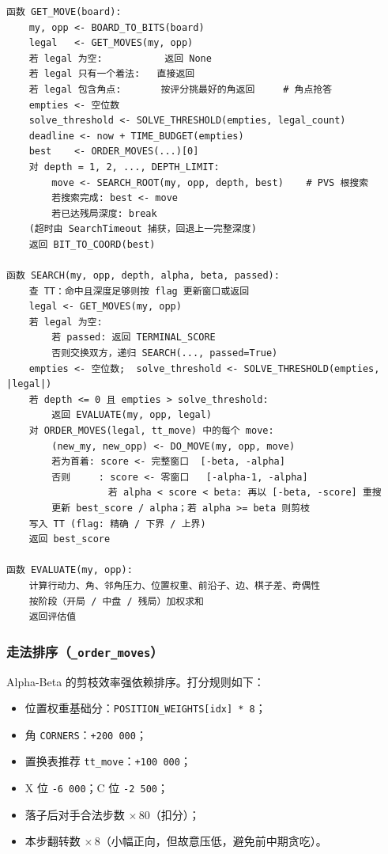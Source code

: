 \documentclass[UTF8,a4paper,11pt]{ctexart}
\begin{document}
\begin{lstlisting}[style=pseudostyle,caption={最终版伪代码（对应 \texttt{main.py}）}]
函数 GET_MOVE(board):
    my, opp <- BOARD_TO_BITS(board)
    legal   <- GET_MOVES(my, opp)
    若 legal 为空:           返回 None
    若 legal 只有一个着法:   直接返回
    若 legal 包含角点:       按评分挑最好的角返回     # 角点抢答
    empties <- 空位数
    solve_threshold <- SOLVE_THRESHOLD(empties, legal_count)
    deadline <- now + TIME_BUDGET(empties)
    best    <- ORDER_MOVES(...)[0]
    对 depth = 1, 2, ..., DEPTH_LIMIT:
        move <- SEARCH_ROOT(my, opp, depth, best)    # PVS 根搜索
        若搜索完成: best <- move
        若已达残局深度: break
    (超时由 SearchTimeout 捕获，回退上一完整深度)
    返回 BIT_TO_COORD(best)

函数 SEARCH(my, opp, depth, alpha, beta, passed):
    查 TT：命中且深度足够则按 flag 更新窗口或返回
    legal <- GET_MOVES(my, opp)
    若 legal 为空:
        若 passed: 返回 TERMINAL_SCORE
        否则交换双方，递归 SEARCH(..., passed=True)
    empties <- 空位数;  solve_threshold <- SOLVE_THRESHOLD(empties, |legal|)
    若 depth <= 0 且 empties > solve_threshold:
        返回 EVALUATE(my, opp, legal)
    对 ORDER_MOVES(legal, tt_move) 中的每个 move:
        (new_my, new_opp) <- DO_MOVE(my, opp, move)
        若为首着: score <- 完整窗口  [-beta, -alpha]
        否则     : score <- 零窗口   [-alpha-1, -alpha]
                  若 alpha < score < beta: 再以 [-beta, -score] 重搜
        更新 best_score / alpha；若 alpha >= beta 则剪枝
    写入 TT (flag: 精确 / 下界 / 上界)
    返回 best_score

函数 EVALUATE(my, opp):
    计算行动力、角、邻角压力、位置权重、前沿子、边、棋子差、奇偶性
    按阶段（开局 / 中盘 / 残局）加权求和
    返回评估值
\end{lstlisting}

\subsubsection*{走法排序（\texttt{\_order\_moves}）}

Alpha-Beta 的剪枝效率强依赖排序。打分规则如下：
\begin{itemize}[leftmargin=1.5em,itemsep=1pt]
    \item 位置权重基础分：\texttt{POSITION\_WEIGHTS[idx] * 8}；
    \item 角 \texttt{CORNERS}：\texttt{+200\,000}；
    \item 置换表推荐 \texttt{tt\_move}：\texttt{+100\,000}；
    \item X 位 \texttt{-6\,000}；C 位 \texttt{-2\,500}；
    \item 落子后对手合法步数 $\times\, 80$（扣分）；
    \item 本步翻转数 $\times\, 8$（小幅正向，但故意压低，避免前中期贪吃）。
\end{itemize}
\end{document}
